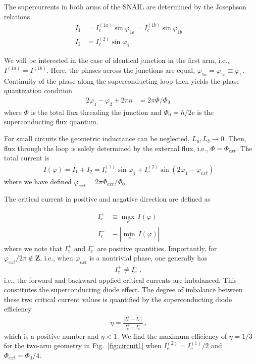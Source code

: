 \documentclass[aps,rsi,reprint,amsmath,amssymb,floatfix,longbibliography,superscriptaddress]{revtex4-1}
\begin{document}
The supercurrents in both arms of the SNAIL are determined by the Josephson relations
\begin{align}
    I_1 &= I_c^{(1a)} \sin \varphi_{1a} = I_c^{(1b)} \sin \varphi_{1b} \\
    I_2 &= I_c^{(2)} \sin \varphi_1 \,.
\end{align}

We will be interested in the case of identical junction in the first arm, 
i.e., $I^{(1a)} = I^{(1b)}$. Here, the phases across the junctions are equal,
$\varphi_{1a} = \varphi_{1b} \equiv \varphi_1$.
Continuity of the phase along the superconducting loop then
yields the phase quantization condition
\begin{align}
	2\varphi_1 - \varphi_2 + 2\pi n &= 2\pi \Phi / \Phi_0 \,
\end{align}
where $\Phi$ is the total flux threading the junction and $\Phi_0 = h/2e$ is the
superconducting flux quantum.


For small circuits the geometric
inductance can be neglected, $L_a,L_b \rightarrow 0$.
Then, flux through the loop is solely determined by the
external flux, i.e., $\Phi = \Phi_{ext}$.
The total current is
\begin{align}
	I(\varphi) = I_1 + I_2 = I_c^{(1)} \sin \varphi_1 +  I_c^{(2)} \sin
	\left(2\varphi_1
	-\varphi_{ext} \right)
\end{align}
where we have defined $\varphi_{ext} = 2\pi\Phi_{ext}/\Phi_0$.

The critical current in positive and negative direction are defined as

\begin{align}
	I_c^+ &\equiv \max_\varphi \, I(\varphi) 
	\nonumber\\
	I_c^- &\equiv \left|\min_\varphi \, I(\varphi) \right|
	\label{eq:icm}
\end{align}
where we note that $I_c^+$ and $I_c^-$
are positive quantities.
Importantly, for $\varphi_{ext}/2\pi \notin \mathbf{Z}$, i.e., when $\varphi_{ext}$ is a nontrivial phase,
one generally has
\begin{align}
	I_c^{+}
	\ne
	I_c^{-} \,,
\end{align}
i.e., the forward and backward applied critical currents are imbalanced.
This constitutes the superconducting diode effect. The degree of imbalance between these two critical current values is quantified by the superconducting diode efficiency
\begin{align}
	\eta = \frac{|I_c^{+} - I_c^-|}{I_c^+ + I_c^-} \,,
\end{align}
which is a positive number and $\eta < 1$.
We find the maximum efficiency of $\eta=1/3$ for the two-arm geometry
in Fig.~\ref{fig:circuit1} when $I_c^{(2)} =
I_c^{(1)}/2$ and $\Phi_{ext} = \Phi_0/4$.
\end{document}
